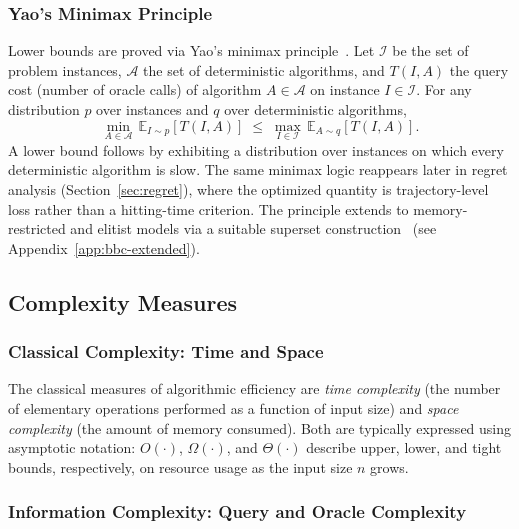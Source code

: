 \subsubsection{Yao's Minimax Principle}
\label{subsubsec:yaomini}

Lower bounds are proved via Yao's minimax
principle~\cite{yao1977probabilistic}. Let $\mathcal{I}$ be the set
of problem instances, $\mathcal{A}$ the set of deterministic
algorithms, and $T(I,A)$ the query cost (number of oracle calls) of
algorithm $A \in \mathcal{A}$ on instance $I \in \mathcal{I}$. For
any distribution $p$ over instances and $q$ over deterministic
algorithms,
\[
  \min_{A \in \mathcal{A}}\,\mathbb{E}_{I \sim p}[T(I,A)]
  \;\leq\;
  \max_{I \in \mathcal{I}}\,\mathbb{E}_{A \sim q}[T(I,A)].
\]
A lower bound follows by exhibiting a distribution over instances on
which every deterministic algorithm is slow. The same minimax logic
reappears later in regret analysis (Section~\ref{sec:regret}), where
the optimized quantity is trajectory-level loss rather than a hitting-time
criterion. The principle extends to memory-restricted and elitist models
via a suitable superset construction~\cite{doerr2015onemax} (see
Appendix~\ref{app:bbc-extended}).

\subsection{Complexity Measures}
\subsubsection{Classical Complexity: Time and Space}
The classical measures of algorithmic efficiency are \textit{time
complexity} (the number of elementary operations performed as a
function of input size) and \textit{space complexity} (the amount
of memory consumed). Both are typically expressed using asymptotic
notation: $O(\cdot)$, $\Omega(\cdot)$, and $\Theta(\cdot)$ describe
upper, lower, and tight bounds, respectively, on resource usage as
the input size
$n$ grows.

\subsubsection{Information Complexity: Query and Oracle Complexity}
\label{subsubsec:infocomplexity}

